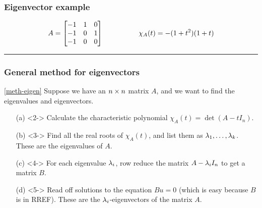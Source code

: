 \documentclass[9pt]{beamer}
\begin{document}
\begin{frame}[t]
 \frametitle{Eigenvector example}
 \[ 
   A = \left[\begin{matrix} -1 & 1 & 0 \\ -1 & 0 & 1 \\ -1 & 0 & 0 \end{matrix}\right]
   \hspace{5em}
   \chi_A(t) = -(1+t^2)(1+t)
 \]
 \medskip \hrule\medskip

\end{frame}

\begin{frame}[t]
 \frametitle{General method for eigenvectors}
 
 \begin{method*}{\ref{meth-eigen}}
  Suppose we have an $n\times n$ matrix $A$, and we want to find the
  eigenvalues and eigenvectors.
  \begin{itemize}
   \item[(a)]<2-> Calculate the characteristic polynomial
    $\chi_A(t)=\det(A-t I_n)$.
   \item[(b)]<3-> Find all the real roots of $\chi_A(t)$, and list them as
    $\lambda_1,\dotsc,\lambda_k$.  These are the eigenvalues of $A$.
   \item[(c)]<4-> For each eigenvalue $\lambda_i$, row reduce the matrix
    $A-\lambda_i I_n$ to get a matrix $B$.
   \item[(d)]<5-> Read off solutions to the equation $Bu=0$ 
    (which is easy because $B$ is in RREF).  These are the
    $\lambda_i$-eigenvectors of the matrix $A$.
  \end{itemize}
 \end{method*}
\end{frame}
\end{document}

